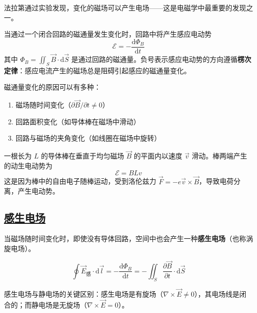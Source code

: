 法拉第通过实验发现，变化的磁场可以产生电场——这是电磁学中最重要的发现之一。

\begin{theorem}[法拉第电磁感应定律]
    当通过一个闭合回路的磁通量发生变化时，回路中将产生感应电动势
    \begin{equation}
        \mathcal{E} = -\frac{\mathrm{d}\Phi_B}{\mathrm{d}t}
    \end{equation}
    其中 $\Phi_B = \iint_S \vec{B} \cdot \mathrm{d}\vec{S}$ 是通过回路的磁通量。负号表示感应电动势的方向遵循\textbf{楞次定律}：感应电流产生的磁场总是阻碍引起感应的磁通量变化。
\end{theorem}

磁通量变化的原因可以有多种：
\begin{enumerate}
    \item 磁场随时间变化（$\partial \vec{B}/\partial t \neq 0$）
    \item 回路面积变化（如导体棒在磁场中滑动）
    \item 回路与磁场的夹角变化（如线圈在磁场中旋转）
\end{enumerate}

\begin{example}[导体棒在磁场中滑动]
    一根长为 $L$ 的导体棒在垂直于均匀磁场 $\vec{B}$ 的平面内以速度 $\vec{v}$ 滑动。棒两端产生的动生电动势为
    \begin{equation}
        \mathcal{E} = BLv
    \end{equation}
    这是因为棒中的自由电子随棒运动，受到洛伦兹力 $\vec{F} = -e\vec{v} \times \vec{B}$，导致电荷分离，产生电动势。
\end{example}

\subsection{\protect\hyperlink{:}{感生电场}}

当磁场随时间变化时，即使没有导体回路，空间中也会产生一种\textbf{感生电场}（也称涡旋电场）。

\begin{equation}
    \oint \vec{E}_{\text{感}} \cdot \mathrm{d}\vec{l} = -\frac{\mathrm{d}\Phi_B}{\mathrm{d}t} = -\iint_S \frac{\partial \vec{B}}{\partial t}\cdot\mathrm{d}\vec{S}
\end{equation}

感生电场与静电场的关键区别：感生电场是有旋场（$\nabla \times \vec{E} \neq 0$），其电场线是闭合的；而静电场是无旋场（$\nabla \times \vec{E} = 0$）。

